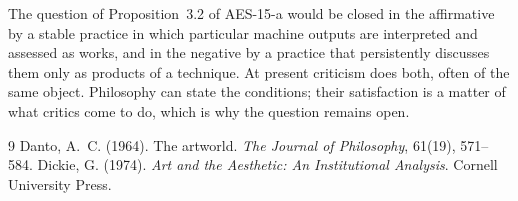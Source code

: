 \documentclass{situationist-preprint}
\begin{document}
The question of Proposition~3.2 of AES-15-a would be closed in the affirmative by a stable practice in which particular machine outputs are interpreted and assessed as works, and in the negative by a practice that persistently discusses them only as products of a technique. At present criticism does both, often of the same object. Philosophy can state the conditions; their satisfaction is a matter of what critics come to do, which is why the question remains open.

\begin{thebibliography}{9}\small
{} Danto, A.~C. (1964). The artworld. \emph{The Journal of Philosophy}, 61(19), 571--584.
 Dickie, G. (1974). \emph{Art and the Aesthetic: An Institutional Analysis}. Cornell University Press.
\end{thebibliography}
\end{document}
